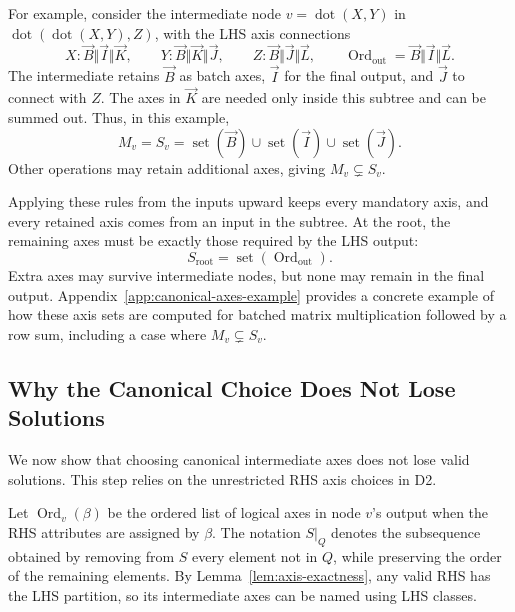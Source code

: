 For example, consider the intermediate node $v=\operatorname{dot}(X,Y)$ in
$\operatorname{dot}(\operatorname{dot}(X,Y),Z)$, with the LHS axis connections
\begin{equation}
 X:\vec B\Vert\vec I\Vert\vec K,\qquad
 Y:\vec B\Vert\vec K\Vert\vec J,\qquad
 Z:\vec B\Vert\vec J\Vert\vec L,\qquad
 \operatorname{Ord}_{\mathrm{out}}=\vec B\Vert\vec I\Vert\vec L.
\end{equation}
The intermediate retains $\vec B$ as batch axes, $\vec I$ for the final
output, and $\vec J$ to connect with $Z$.
The axes in $\vec K$ are needed only inside this subtree
and can be summed out. Thus, in this example,
\begin{equation}
 M_v=S_v=\operatorname{set}(\vec B)\cup\operatorname{set}(\vec I)
 \cup\operatorname{set}(\vec J).
\end{equation}
Other operations may retain additional axes, giving $M_v\subsetneq S_v$.

Applying these rules from the inputs upward keeps every mandatory axis,
and every retained axis comes from an input in the subtree. At the root,
the remaining axes must be exactly those required by the LHS output:
\begin{equation}
 S_{\mathrm{root}}=\operatorname{set}(\operatorname{Ord}_{\mathrm{out}}).
 \label{eq:root-live}
\end{equation}
Extra axes may survive intermediate nodes, but none may remain in the final
output. Appendix~\ref{app:canonical-axes-example} provides a concrete example
of how these axis sets are computed for batched matrix multiplication
followed by a row sum, including a case where $M_v\subsetneq S_v$.

\subsection{Why the Canonical Choice Does Not Lose Solutions}
\label{sec:canonicalization}
We now show that choosing canonical intermediate axes does not lose valid
solutions. This step relies on the unrestricted RHS axis choices in D2.

Let $\operatorname{Ord}_v(\beta)$ be the ordered list of logical axes
in node $v$'s output when the RHS attributes are assigned by $\beta$.
The notation $S|_Q$ denotes the subsequence obtained by removing from $S$
every element not in $Q$, while preserving the order of the remaining elements. By
Lemma~\ref{lem:axis-exactness}, any valid RHS has the LHS partition, so its
intermediate axes can be named using LHS classes.

